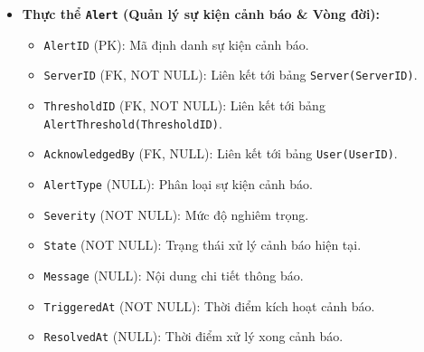 \begin{itemize}[leftmargin=2em]
\begin{itemize}
        \item \texttt{WarningValue} (NULL): Giá trị cảnh báo cấp độ Warning.
        \item \texttt{CriticalValue} (NULL): Giá trị cảnh báo cấp độ Critical.
        \item \texttt{IsActive} (NOT NULL): Trạng thái kích hoạt cấu hình.
    \end{itemize}
    \item \textbf{Thực thể \texttt{Alert} (Quản lý sự kiện cảnh báo \& Vòng đời):}
    \begin{itemize}
        \item \texttt{AlertID} (PK): Mã định danh sự kiện cảnh báo.
        \item \texttt{ServerID} (FK, NOT NULL): Liên kết tới bảng \texttt{Server(ServerID)}.
        \item \texttt{ThresholdID} (FK, NOT NULL): Liên kết tới bảng \texttt{AlertThreshold(ThresholdID)}.
        \item \texttt{AcknowledgedBy} (FK, NULL): Liên kết tới bảng \texttt{User(UserID)}.
        \item \texttt{AlertType} (NULL): Phân loại sự kiện cảnh báo.
        \item \texttt{Severity} (NOT NULL): Mức độ nghiêm trọng.
        \item \texttt{State} (NOT NULL): Trạng thái xử lý cảnh báo hiện tại.
        \item \texttt{Message} (NULL): Nội dung chi tiết thông báo.
        \item \texttt{TriggeredAt} (NOT NULL): Thời điểm kích hoạt cảnh báo.
        \item \texttt{ResolvedAt} (NULL): Thời điểm xử lý xong cảnh báo.
    \end{itemize}
\end{itemize}

